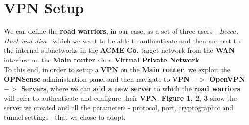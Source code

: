 \section{VPN Setup}
We can define the \textbf{road warriors}, in our case, as a set of three users - \textit{Becca, Huck and Jim} - which we want to be able to authenticate and then connect to the internal subnetworks in the \textbf{ACME Co.} target network from the \textbf{WAN} interface on the \textbf{Main router} via a \textbf{Virtual Private Network}.\\
To this end, in order to setup a \textbf{VPN} on the \textbf{Main router}, we exploit the \textbf{OPNSense} administration panel and then navigate to \textbf{VPN $->$ OpenVPN $->$ Servers}, where we can \textbf{add a new server} to which the \textbf{road warriors} will refer to authenticate and configure their \textbf{VPN}. \textbf{Figure 1, 2, 3} show the server we created and all the parameters - protocol, port, cryptographic and tunnel settings - that we chose to adopt.\\
